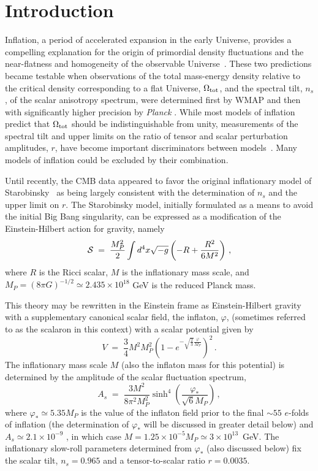 \documentclass[aps,prev,twocolumn,preprintnumbers,floatfix,nofootinbib]{revtex4-1}
\newcommand{\beq}{\begin{equation}}
\newcommand{\eeq}{\end{equation}}
\begin{document}
\section{Introduction}
\label{sec:intro}
Inflation, a period of accelerated expansion in the early Universe, provides a compelling explanation for the origin of primordial density fluctuations and the near-flatness and homogeneity of the observable Universe~\cite{reviews}. These two predictions became testable when observations of the total mass-energy density relative to the critical density corresponding to a flat Universe, $\Omega_{\rm tot}$, 
and the spectral tilt, $n_s$, of the scalar anisotropy spectrum, were determined first by WMAP \cite{wmap} and then with significantly higher precision by \textit{Planck} \cite{Planck}. While most models of inflation predict that $\Omega_{\rm tot}$ should be indistinguishable from unity, measurements of 
the spectral tilt and upper limits on the ratio of tensor and scalar perturbation amplitudes, $r$, have become important discriminators between models~\cite{Planck,BICEP2021,Tristram:2021tvh}.
Many models of inflation could be excluded by their combination. 

Until recently, the CMB data appeared to favor the original inflationary model of Starobinsky~\cite{Staro} as being largely consistent with the determination of $n_s$ and the upper limit on $r$. The Starobinsky model, initially formulated as a means to avoid the initial Big Bang singularity, can be expressed as a modification of the Einstein-Hilbert action for gravity, namely
\beq
{\cal S} \; = \;  \frac{M_P^2}{2}\int d^4x \sqrt{-g} \left(-R + \frac{R^2}{6M^2} \right) \, ,
\label{SStaro}
\eeq
where $R$ is the Ricci scalar, $M$ is the inflationary mass scale, and $M_P = (8\pi G)^{-1/2} \simeq 2.435 \times 10^{18}$ GeV is the reduced Planck mass.

This theory may be rewritten in the Einstein frame as Einstein-Hilbert gravity with a supplementary canonical scalar field, the inflaton, $\varphi$, (sometimes referred to as the scalaron in this context) \cite{WhittStelle,Barrow:1988xh,Kalara:1990ar} with a scalar potential given by
\beq
V \; = \; \frac34 M^2 M_P^2 \left(1 - e^{-\sqrt{\frac23} \frac{\varphi}{M_P}} \right)^2 \, . 
\label{starpot}
\eeq
The inflationary mass scale $M$ (also the inflaton mass for this potential) is determined by the amplitude of the scalar fluctuation spectrum,
\beq
A_s \; = \; \frac{3 M^2}{8\pi^2 M_P^2} \sinh^4 \left(\frac{\varphi_*}{\sqrt{6}M_P} \right) \, , 
\label{AsStaro}
\eeq
where $\varphi_* \simeq 5.35 M_P$ is the value of the inflaton field prior to the final $\sim 55$ $e$-folds of inflation (the determination of $\varphi_*$ will be discussed in greater detail below) and $A_s \simeq 2.1 \times 10^{-9}$ \cite{Planck}, in which case $M = 1.25 \times 10^{-5} M_P \simeq 3 \times 10^{13}$~GeV. The inflationary slow-roll parameters determined from $\varphi_*$ (also discussed below) fix the scalar tilt, $n_s = 0.965$ and a tensor-to-scalar ratio $r = 0.0035$.
\end{document}

